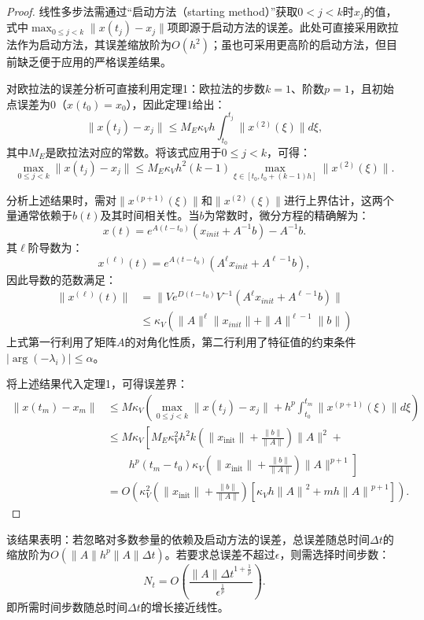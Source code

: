 \documentclass{article}
\theoremstyle{definition}
\begin{document}
\begin{proof}
线性多步法需通过“启动方法（starting method）”获取\(0 < j < k\)时\(x_j\)的值，式中\(\max_{0 \leq j < k} \|x(t_j) - x_j\|\)项即源于启动方法的误差。此处可直接采用欧拉法作为启动方法，其误差缩放阶为\(O(h^2)\)；虽也可采用更高阶的启动方法，但目前缺乏便于应用的严格误差结果。

对欧拉法的误差分析可直接利用定理1：欧拉法的步数\(k=1\)、阶数\(p=1\)，且初始点误差为0（\(x(t_0) = x_0\)），因此定理1给出：
\[
\|x(t_j) - x_j\| \leq M_E \kappa_V h \int_{t_0}^{t_j} \|x^{(2)}(\xi)\| d\xi, 
\]
其中\(M_E\)是欧拉法对应的常数。将该式应用于\(0 \leq j < k\)，可得：
\[
\max_{0 \leq j < k} \|x(t_j) - x_j\| \leq M_E \kappa_V h^2 (k-1) \max_{\xi \in [t_0, t_0 + (k-1)h]} \|x^{(2)}(\xi)\|.
\]

分析上述结果时，需对\(\|x^{(p+1)}(\xi)\|\)和\(\|x^{(2)}(\xi)\|\)进行上界估计，这两个量通常依赖于\(b(t)\)及其时间相关性。当\(b\)为常数时，微分方程的精确解为：
\[
x(t) = e^{A(t - t_0)} \left( x_{init} + A^{-1} b \right) - A^{-1} b. 
\]
其\(\ell\)阶导数为：
\[
x^{(\ell)}(t) = e^{A(t - t_0)} \left( A^\ell x_{init} + A^{\ell-1} b \right), 
\]
因此导数的范数满足：
\[
\begin{aligned}
\|x^{(\ell)}(t)\| &= \| V e^{D(t - t_0)} V^{-1} \left( A^\ell x_{init} + A^{\ell-1} b \right) \| \\
&\leq \kappa_V \left( \|A\|^\ell \|x_{init}\| + \|A\|^{\ell-1} \|b\| \right)
\end{aligned}
\]
上式第一行利用了矩阵\(A\)的对角化性质，第二行利用了特征值的约束条件\(|\arg(-\lambda_i)| \leq \alpha\)。

将上述结果代入定理1，可得误差界：
\[
\begin{aligned}
\|x(t_m) - x_m\| 
&\leq M \kappa_V \left( 
  \max_{0 \leq j < k} \|x(t_j) - x_j\| + 
  h^p \int_{t_0}^{t_m} \|x^{(p+1)}(\xi)\| d\xi 
\right) \\
&\leq M \kappa_V \left[ 
  M_E \kappa_V^2 h^2 k \left( \|x_{\text{init}}\| + \frac{\|b\|}{\|A\|} \right) \|A\|^2 + \right. \\
&\qquad \left. h^p (t_m - t_0) \kappa_V \left( \|x_{\text{init}}\| + \frac{\|b\|}{\|A\|} \right) \|A\|^{p+1} 
\right] \\
&= O\left( 
  \kappa_V^2 \left( \|x_{\text{init}}\| + \frac{\|b\|}{\|A\|} \right) 
  \left[ \kappa_V {h\|A\|}^2 + m {h\|A\|}^{p+1} \right] 
\right).
\end{aligned}
\]
\end{proof}

该结果表明：若忽略对多数参量的依赖及启动方法的误差，总误差随总时间\(\Delta t\)的缩放阶为\(O\left( {\|A\| h}^p \|A\| \Delta t \right)\)。若要求总误差不超过\(\epsilon\)，则需选择时间步数：
\[
N_t = O\left( \frac{{\|A\| \Delta t}^{1 + \frac{1}{p}}}{\epsilon^{\frac{1}{p}}} \right).
\]
即所需时间步数随总时间\(\Delta t\)的增长接近线性。
\end{document}
